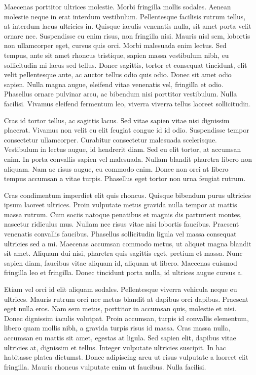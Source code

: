 Maecenas porttitor ultrices molestie.
Morbi fringilla mollis sodales.
Aenean molestie neque in erat interdum vestibulum.
Pellentesque facilisis rutrum tellus, at interdum lacus ultricies in.
Quisque iaculis venenatis nulla, sit amet porta velit ornare nec.
Suspendisse eu enim risus, non fringilla nisi.
Mauris nisl sem, lobortis non ullamcorper eget, cursus quis orci.
Morbi malesuada enim lectus.
Sed tempus, ante sit amet rhoncus tristique, sapien massa vestibulum nibh, eu sollicitudin mi lacus sed tellus.
Donec sagittis, tortor et consequat tincidunt, elit velit pellentesque ante, ac auctor tellus odio quis odio.
Donec sit amet odio sapien.
Nulla magna augue, eleifend vitae venenatis vel, fringilla et odio.
Phasellus ornare pulvinar arcu, ac bibendum nisi porttitor vestibulum.
Nulla facilisi.
Vivamus eleifend fermentum leo, viverra viverra tellus laoreet sollicitudin.

Cras id tortor tellus, ac sagittis lacus.
Sed vitae sapien vitae nisi dignissim placerat.
Vivamus non velit eu elit feugiat congue id id odio.
Suspendisse tempor consectetur ullamcorper.
Curabitur consectetur malesuada scelerisque.
Vestibulum in lectus augue, id hendrerit diam.
Sed eu elit tortor, at accumsan enim.
In porta convallis sapien vel malesuada.
Nullam blandit pharetra libero non aliquam.
Nam ac risus augue, eu commodo enim.
Donec non orci at libero tempus accumsan a vitae turpis.
Phasellus eget tortor non urna feugiat rutrum.

Cras condimentum imperdiet elit quis rhoncus.
Quisque bibendum purus ultricies ipsum laoreet ultrices.
Proin vulputate metus gravida nulla tempor at mattis massa rutrum.
Cum sociis natoque penatibus et magnis dis parturient montes, nascetur ridiculus mus.
Nullam nec risus vitae nisi lobortis faucibus.
Praesent venenatis convallis faucibus.
Phasellus sollicitudin ligula vel massa consequat ultricies sed a mi.
Maecenas accumsan commodo metus, ut aliquet magna blandit sit amet.
Aliquam dui nisi, pharetra quis sagittis eget, pretium et massa.
Nunc sapien diam, faucibus vitae aliquam id, aliquam ut libero.
Maecenas euismod fringilla leo et fringilla.
Donec tincidunt porta nulla, id ultrices augue cursus a.

Etiam vel orci id elit aliquam sodales.
Pellentesque viverra vehicula neque eu ultrices.
Mauris rutrum orci nec metus blandit at dapibus orci dapibus.
Praesent eget nulla eros.
Nam sem metus, porttitor in accumsan quis, molestie et nisi.
Donec dignissim iaculis volutpat.
Proin accumsan, turpis id convallis elementum, libero quam mollis nibh, a gravida turpis risus id massa.
Cras massa nulla, accumsan eu mattis sit amet, egestas at ligula.
Sed sapien elit, dapibus vitae ultricies at, dignissim et tellus.
Integer vulputate ultricies suscipit.
In hac habitasse platea dictumst.
Donec adipiscing arcu ut risus vulputate a laoreet elit fringilla.
Mauris rhoncus vulputate enim ut faucibus.
Nulla facilisi.

